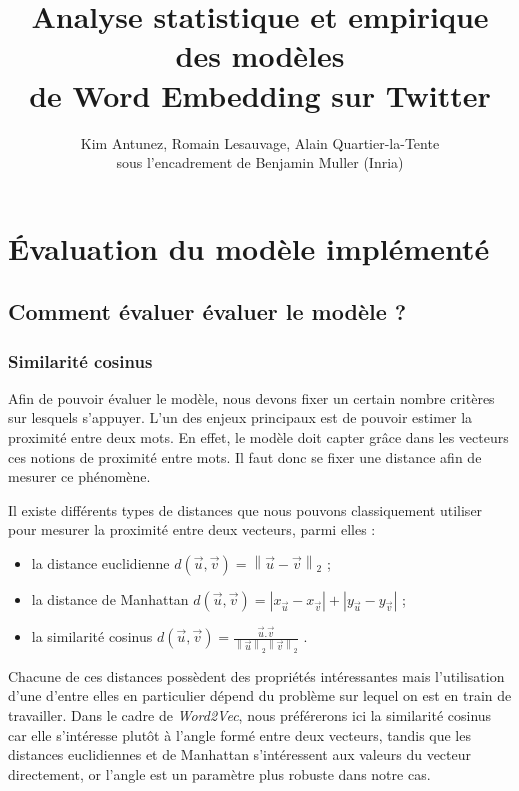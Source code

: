 \documentclass[11pt,french,french]{article}
\title{Analyse statistique et empirique des modèles\\
de Word Embedding sur Twitter}
\author{Kim Antunez, Romain Lesauvage, Alain Quartier-la-Tente\\
sous l'encadrement de Benjamin Muller (Inria)}
\date{}
\begin{document}
\maketitle


\section{Évaluation du modèle
implémenté}\label{uxe9valuation-du-moduxe8le-impluxe9mentuxe9}

\subsection{Comment évaluer évaluer le modèle
?}\label{comment-uxe9valuer-uxe9valuer-le-moduxe8le}

\subsubsection{Similarité cosinus}\label{similarituxe9-cosinus}

Afin de pouvoir évaluer le modèle, nous devons fixer un certain nombre
critères sur lesquels s'appuyer. L'un des enjeux principaux est de
pouvoir estimer la proximité entre deux mots. En effet, le modèle doit
capter grâce dans les vecteurs ces notions de proximité entre mots. Il
faut donc se fixer une distance afin de mesurer ce phénomène.

Il existe différents types de distances que nous pouvons classiquement
utiliser pour mesurer la proximité entre deux vecteurs, parmi elles :

\begin{itemize}
\item la distance euclidienne $ d(\vec{u},\vec{v}) = \left\| \vec{u} - \vec{v}  \right\|_2$ ;
\item la distance de Manhattan $ d(\vec{u},\vec{v}) = |x_{\vec{u}} - x_{\vec{v}} | + |y_{\vec{u}} - y_{\vec{v}} |$ ;
\item la similarité cosinus $ d(\vec{u}, \vec{v}) = \frac{\vec{u}.\vec{v}}{\left\| \vec{u} \right\|_2  \left\| \vec{v} \right\|_2 }$ .
\end{itemize}

Chacune de ces distances possèdent des propriétés intéressantes mais
l'utilisation d'une d'entre elles en particulier dépend du problème sur
lequel on est en train de travailler. Dans le cadre de \emph{Word2Vec},
nous préférerons ici la similarité cosinus car elle s'intéresse plutôt à
l'angle formé entre deux vecteurs, tandis que les distances euclidiennes
et de Manhattan s'intéressent aux valeurs du vecteur directement, or
l'angle est un paramètre plus robuste dans notre cas.
\end{document}
